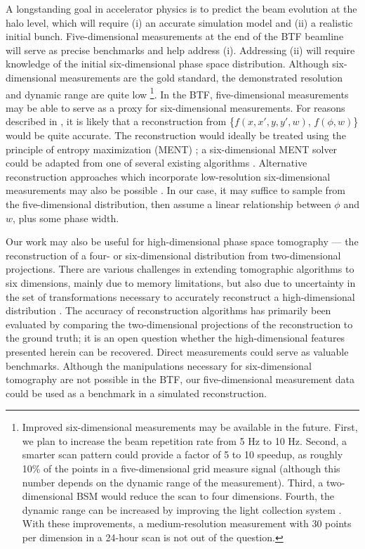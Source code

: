 \documentclass[%
 reprint,
 amsmath,amssymb,
 aps,
prstab,
]{revtex4-2}
\begin{document}
A longstanding goal in accelerator physics is to predict the beam evolution at the halo level, which will require (i) an accurate simulation model and (ii) a realistic initial bunch. Five-dimensional measurements at the end of the BTF beamline will serve as precise benchmarks and help address (i). Addressing (ii) will require knowledge of the initial six-dimensional phase space distribution. Although six-dimensional measurements are the gold standard, the demonstrated resolution and dynamic range are quite low %
\footnote{Improved six-dimensional measurements may be available in the future. First, we plan to increase the beam repetition rate from 5 Hz to 10 Hz. Second, a smarter scan pattern could provide a factor of 5 to 10 speedup, as roughly 10\% of the points in a five-dimensional grid measure signal (although this number depends on the dynamic range of the measurement). Third, a two-dimensional BSM would reduce the scan to four dimensions. Fourth, the dynamic range can be increased by improving the light collection system \cite{Aleksandrov2021}. With these improvements, a medium-resolution measurement with 30 points per dimension in a 24-hour scan is not out of the question.%
}. %
In the BTF, five-dimensional measurements may be able to serve as a proxy for six-dimensional measurements. For reasons described in \cite{Note1}, it is likely that a  reconstruction from \{$f(x, x', y, y', w)$, $f(\phi, w)$\} would be quite accurate. The reconstruction would ideally be treated using the principle of entropy maximization (MENT) \cite{Skilling1991}; a six-dimensional MENT solver could be adapted from one of several existing algorithms \cite{Skilling1984, Wong2022-tomography}. Alternative reconstruction approaches which incorporate low-resolution six-dimensional measurements may also be possible \cite{Dropulic2021}. In our case, it may suffice to sample from the five-dimensional distribution, then assume a linear relationship between $\phi$ and $w$, plus some phase width.

Our work may also be useful for high-dimensional phase space tomography --- the reconstruction of a four- or six-dimensional distribution from two-dimensional projections. There are various challenges in extending tomographic algorithms to six dimensions, mainly due to memory limitations, but also due to uncertainty in the set of transformations necessary to accurately reconstruct a high-dimensional distribution \cite{Hock2013, Wang2019, Wolski2020, Marchetti2021, Jaster-Merz2022, Wong2022-tomography, Wolski2022}. The accuracy of reconstruction algorithms has primarily been evaluated by comparing the two-dimensional projections of the reconstruction to the ground truth; it is an open question whether the high-dimensional features presented herein can be recovered. Direct measurements could serve as valuable benchmarks. Although the manipulations necessary for six-dimensional tomography are not possible in the BTF, our five-dimensional measurement data \cite{Hoover2023_Zenodo} could be used as a benchmark in a simulated reconstruction.
\end{document}
